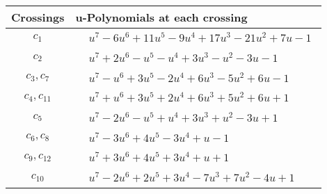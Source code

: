 \documentclass[1p]{elsarticle_modified}
\theoremstyle{definition}
\begin{document}
\begin{tabular}{m{50pt}|m{274pt}}
Crossings & \hspace{64pt}u-Polynomials at each crossing \\
\hline $$\begin{aligned}c_{1}\end{aligned}$$&$\begin{aligned}
&u^7-6 u^6+11 u^5-9 u^4+17 u^3-21 u^2+7 u-1
\end{aligned}$\\
\hline $$\begin{aligned}c_{2}\end{aligned}$$&$\begin{aligned}
&u^7+2 u^6- u^5- u^4+3 u^3- u^2-3 u-1
\end{aligned}$\\
\hline $$\begin{aligned}c_{3},c_{7}\end{aligned}$$&$\begin{aligned}
&u^7- u^6+3 u^5-2 u^4+6 u^3-5 u^2+6 u-1
\end{aligned}$\\
\hline $$\begin{aligned}c_{4},c_{11}\end{aligned}$$&$\begin{aligned}
&u^7+u^6+3 u^5+2 u^4+6 u^3+5 u^2+6 u+1
\end{aligned}$\\
\hline $$\begin{aligned}c_{5}\end{aligned}$$&$\begin{aligned}
&u^7-2 u^6- u^5+u^4+3 u^3+u^2-3 u+1
\end{aligned}$\\
\hline $$\begin{aligned}c_{6},c_{8}\end{aligned}$$&$\begin{aligned}
&u^7-3 u^6+4 u^5-3 u^4+u-1
\end{aligned}$\\
\hline $$\begin{aligned}c_{9},c_{12}\end{aligned}$$&$\begin{aligned}
&u^7+3 u^6+4 u^5+3 u^4+u+1
\end{aligned}$\\
\hline $$\begin{aligned}c_{10}\end{aligned}$$&$\begin{aligned}
&u^7-2 u^6+2 u^5+3 u^4-7 u^3+7 u^2-4 u+1
\end{aligned}$\\
\hline
\end{tabular}\\~\\
\end{document}
